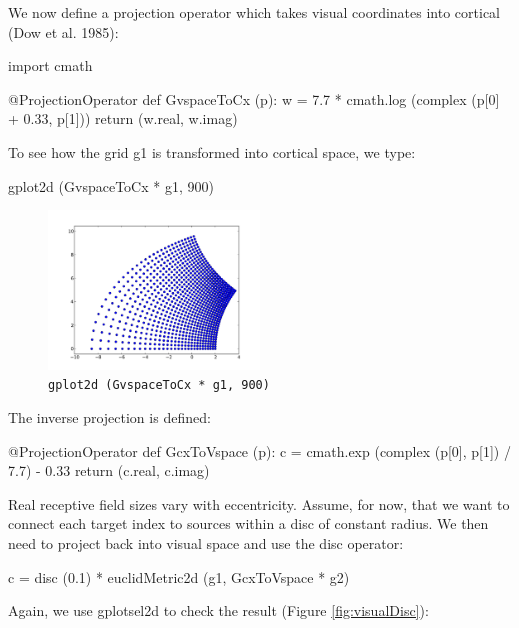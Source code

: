 \documentclass[a4paper,twoside]{report}
\newcommand{\expr}[1]{\lstinline|#1|}
\begin{document}
We now define a projection operator which takes visual coordinates
into cortical (Dow et al. 1985):

\begin{code}{}
  import cmath

  @ProjectionOperator
  def GvspaceToCx (p):
      w = 7.7 * cmath.log (complex (p[0] + 0.33, p[1]))
      return (w.real, w.imag)
\end{code}

To see how the grid g1 is transformed into cortical space, we type:

\begin{code}{}
  gplot2d (GvspaceToCx * g1, 900)
\end{code}

\begin{figure}
  \begin{center}
    \includegraphics[width=0.5\textwidth]{figures/projection}
    \caption[Logarithmic projection]{\label{fig:projection}
      \expr{gplot2d (GvspaceToCx * g1, 900)}
    }
  \end{center}
\end{figure}

The inverse projection is defined:

\begin{code}{}
  @ProjectionOperator
  def GcxToVspace (p):
      c = cmath.exp (complex (p[0], p[1]) / 7.7) - 0.33
      return (c.real, c.imag)
\end{code}

Real receptive field sizes vary with eccentricity.  Assume, for now,
that we want to connect each target index to sources within a disc of
constant radius.  We then need to project back into visual space and
use the disc operator:

\begin{code}{}
  c = disc (0.1) * euclidMetric2d (g1, GcxToVspace * g2)
\end{code}

Again, we use gplotsel2d to check the result (Figure \ref{fig:visualDisc}):
\end{document}
